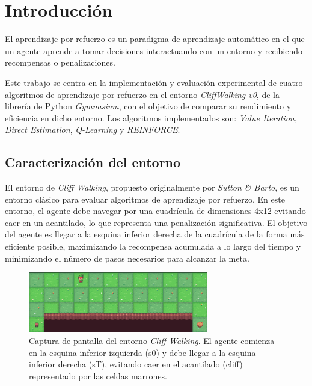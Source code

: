 \section{Introducción}

El aprendizaje por refuerzo es un paradigma de aprendizaje automático en el que un agente aprende a tomar decisiones interactuando con un entorno y recibiendo recompensas o penalizaciones. 

Este trabajo se centra en la implementación y evaluación experimental de cuatro algoritmos de aprendizaje por refuerzo en el entorno \textit{CliffWalking-v0}, de la librería de Python \textit{Gymnasium}, con el objetivo de comparar su rendimiento y eficiencia en dicho entorno. Los algoritmos implementados son: \textit{Value Iteration}, \textit{Direct Estimation}, \textit{Q-Learning} y \textit{REINFORCE}.

\subsection{Caracterización del entorno}

El entorno de \textit{Cliff Walking}, propuesto originalmente por \textit{Sutton \& Barto}, es un entorno clásico para evaluar algoritmos de aprendizaje por refuerzo. En este entorno, el agente debe navegar por una cuadrícula de dimensiones 4x12 evitando caer en un acantilado, lo que representa una penalización significativa. El objetivo del agente es llegar a la esquina inferior derecha de la cuadrícula de la forma más eficiente posible, maximizando la recompensa acumulada a lo largo del tiempo y minimizando el número de pasos necesarios para alcanzar la meta.

\begin{figure}[h]
    \centering
    \includegraphics[width=0.7\textwidth]{images/mapa.png}
    \caption{Captura de pantalla del entorno \textit{Cliff Walking}. El agente comienza en la esquina inferior izquierda (s0) y debe llegar a la esquina inferior derecha (sT), evitando caer en el acantilado (cliff) representado por las celdas marrones.}
    \label{fig:cliff-walking-map}
\end{figure}

